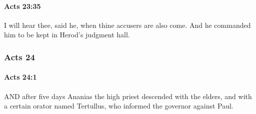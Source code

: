 		\paragraph{Acts 23:35} %
			\label{ACTS-23-35}

			I will hear thee, said he, when thine accusers are also come.  And he commanded him to be kept in Herod's judgment hall.

			\begin{framed}
			\scriptsize
				\begin{compactdesc}
					\item[SBLG] 
				\end{compactdesc}
			\end{framed}

	\subsubsection{Acts 24} %
		\label{ACTS-24}
		
		\paragraph{Acts 24:1} %
			\label{ACTS-24-1}

			AND after five days Ananias the high priest descended with the elders, and with a certain orator named Tertullus, who informed the governor against Paul.

